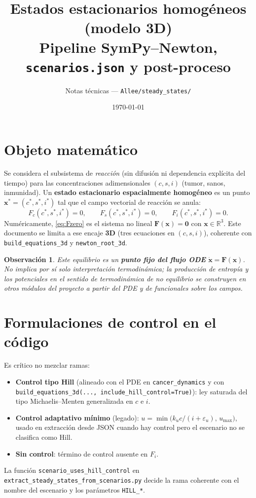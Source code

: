 \documentclass[11pt,a4paper]{article}
\title{Estados estacionarios homogéneos (modelo 3D)\\
\large Pipeline SymPy--Newton, \texttt{scenarios.json} y post-proceso}
\author{Notas técnicas --- \texttt{Allee/steady\_states/}}
\date{\today}
\newtheorem{remark}{Observación}
\begin{document}
\maketitle
\tableofcontents
\vspace{1em}

\section{Objeto matemático}

Se considera el subsistema de \emph{reacción} (sin difusión ni dependencia explícita del tiempo) para las concentraciones adimensionales $(c,s,i)$ (tumor, sanos, inmunidad). Un \textbf{estado estacionario espacialmente homogéneo} es un punto $\mathbf{x}^\ast = (c^\ast,s^\ast,i^\ast)$ tal que el campo vectorial de reacción se anula:
\begin{equation}
\label{eq:Fzero}
F_c(c^\ast,s^\ast,i^\ast)=0,\qquad
F_s(c^\ast,s^\ast,i^\ast)=0,\qquad
F_i(c^\ast,s^\ast,i^\ast)=0.
\end{equation}
Numéricamente, \eqref{eq:Fzero} es el sistema no lineal $\mathbf{F}(\mathbf{x})=\mathbf{0}$ con $\mathbf{x}\in\mathbb{R}^3$. Este documento se limita a ese encaje \textbf{3D} (tres ecuaciones en $(c,s,i)$), coherente con \texttt{build\_equations\_3d} y \texttt{newton\_root\_3d}.

\begin{remark}
Este equilibrio es un \textbf{punto fijo del flujo ODE} $\dot{\mathbf{x}}=\mathbf{F}(\mathbf{x})$. No implica por sí solo interpretación termodinámica; la producción de entropía y los potenciales en el sentido de termodinámica de no equilibrio se construyen en otros módulos del proyecto a partir del PDE y de funcionales sobre los campos.
\end{remark}

\section{Formulaciones de control en el código}

Es crítico no mezclar ramas:
\begin{itemize}[leftmargin=*]
  \item \textbf{Control tipo Hill} (alineado con el PDE en \texttt{cancer\_dynamics} y con \texttt{build\_equations\_3d(..., include\_hill\_control=True)}): ley saturada del tipo Michaelis--Menten generalizada en $c$ e $i$.
  \item \textbf{Control adaptativo mínimo} (legado): $u=\min\!\big(k_u c/(i+\varepsilon_u),\, u_{\max}\big)$, usado en extracción desde JSON cuando hay control pero el escenario no se clasifica como Hill.
  \item \textbf{Sin control}: término de control ausente en $F_i$.
\end{itemize}
La función \texttt{scenario\_uses\_hill\_control} en \texttt{extract\_steady\_states\_from\_scenarios.py} decide la rama coherente con el nombre del escenario y los parámetros \texttt{HILL\_*}.
\end{document}
